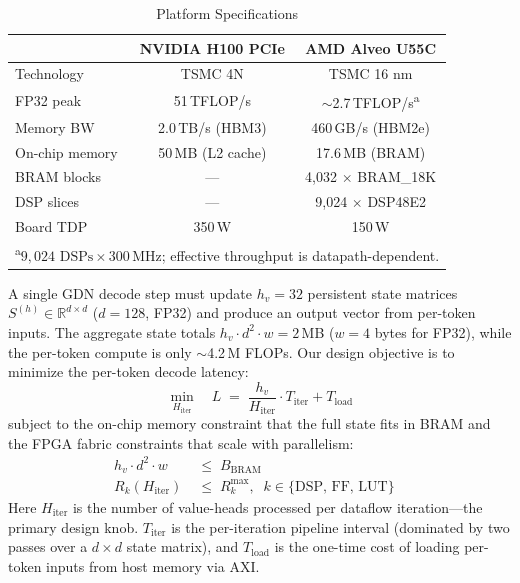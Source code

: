 \documentclass[conference]{IEEEtran}
\begin{document}
\begin{table}[t]
\centering
\caption{Platform Specifications}
\label{tab:platforms}
\begin{tabular}{lcc}
\toprule
& \textbf{NVIDIA H100 PCIe} & \textbf{AMD Alveo U55C} \\
\midrule
Technology & TSMC 4N & TSMC 16 nm \\
FP32 peak & 51\,TFLOP/s & $\sim$2.7\,TFLOP/s\textsuperscript{a} \\
Memory BW & 2.0\,TB/s (HBM3) & 460\,GB/s (HBM2e) \\
On-chip memory & 50\,MB (L2 cache) & 17.6\,MB (BRAM) \\
BRAM blocks & --- & 4{,}032 $\times$ BRAM\_18K \\
DSP slices & --- & 9{,}024 $\times$ DSP48E2 \\
Board TDP & 350\,W & 150\,W \\
\bottomrule
\multicolumn{3}{l}{\footnotesize \textsuperscript{a}$9{,}024 \text{ DSPs} \times 300\,\text{MHz}$; effective throughput is data\-path-dependent.}
\end{tabular}
\end{table}

A single GDN decode step must update $h_v{=}32$ persistent state
matrices $S^{(h)} \in \mathbb{R}^{d \times d}$ ($d{=}128$, FP32) and
produce an output vector from per-token inputs. The aggregate state
totals $h_v \cdot d^2 \cdot w = 2$\,MB ($w{=}4$ bytes for FP32),
while the per-token compute is only $\sim$4.2\,M FLOPs.
Our design objective is to minimize the per-token decode latency:
%
\begin{equation}
  \min_{H_{\mathrm{iter}}} \quad L \;=\;
    \frac{h_v}{H_{\mathrm{iter}}} \cdot T_{\mathrm{iter}}
    + T_{\mathrm{load}}
\label{eq:latency_obj}
\end{equation}
%
subject to the on-chip memory constraint that the full state fits in
BRAM and the FPGA fabric constraints that scale with parallelism:
%
\begin{align}
  h_v \cdot d^2 \cdot w &\;\leq\; B_{\mathrm{BRAM}}
  &
    \label{eq:c_bram} \\
  R_k(H_{\mathrm{iter}}) &\;\leq\; R_k^{\max},\;\;
    k \in \{\text{DSP, FF, LUT}\}
    \label{eq:c_fabric}
\end{align}
%
Here $H_{\mathrm{iter}}$ is the number of value-heads processed per
dataflow iteration---the primary design knob. $T_{\mathrm{iter}}$ is
the per-iteration pipeline interval (dominated by two passes over a
$d \times d$ state matrix), and $T_{\mathrm{load}}$ is the one-time
cost of loading per-token inputs from host memory via AXI.
\end{document}
